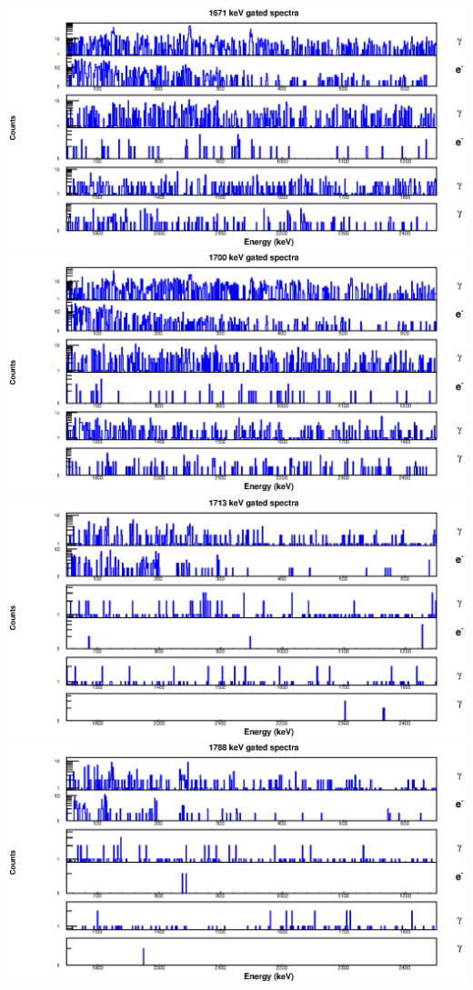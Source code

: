 \begin{landscape}
\includegraphics[scale=1.2]{154Gd_Appendix/1671_combined.eps}
\includegraphics[scale=1.2]{154Gd_Appendix/1700_combined.eps}
\includegraphics[scale=1.2]{154Gd_Appendix/1713_combined.eps}
\includegraphics[scale=1.2]{154Gd_Appendix/1788_combined.eps}

\end{landscape}
